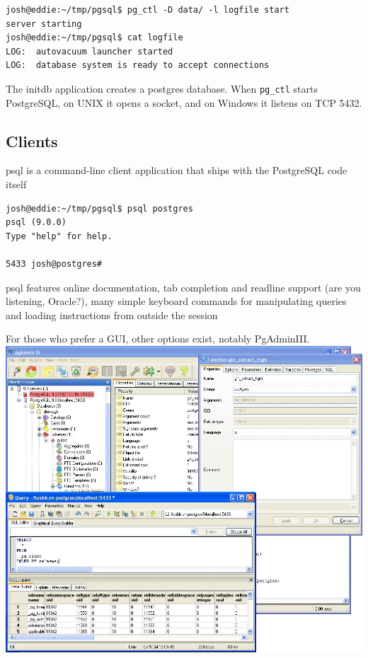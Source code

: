 \documentclass[svgnames]{beamer}
\begin{document}
\begin{frame}[fragile]
\small
\begin{verbatim}
josh@eddie:~/tmp/pgsql$ pg_ctl -D data/ -l logfile start
server starting         
josh@eddie:~/tmp/pgsql$ cat logfile 
LOG:  autovacuum launcher started
LOG:  database system is ready to accept connections
\end{verbatim}
The initdb application creates a postgres database. When \texttt{pg\_ctl} starts
PostgreSQL, on UNIX it opens a socket, and on Windows it listens on TCP 5432.
\normalsize
\end{frame}

\subsection{Clients}
\begin{frame}[fragile]
psql is a command-line client application that ships with the PostgreSQL code itself
\begin{verbatim}
josh@eddie:~/tmp/pgsql$ psql postgres
psql (9.0.0)
Type "help" for help.

5433 josh@postgres# 
\end{verbatim}
psql features online documentation, tab completion and readline support (are you listening, Oracle?), many simple keyboard commands for manipulating queries and loading instructions from outside the session
\end{frame}

\begin{frame}
For those who prefer a GUI, other options exist, notably PgAdminIII.
\includegraphics[width=\textwidth]{pgadmin3_win32.png}
\end{frame}
\end{document}
